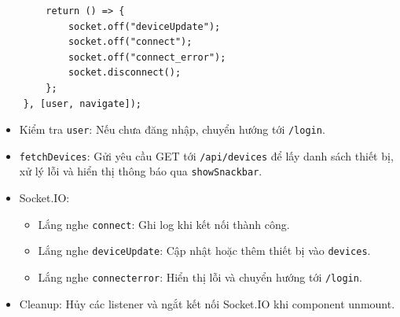 \begin{lstlisting}
        return () => {
            socket.off("deviceUpdate");
            socket.off("connect");
            socket.off("connect_error");
            socket.disconnect();
        };
    }, [user, navigate]);
                \end{lstlisting}
                \begin{itemize}
                    \item Kiểm tra \texttt{user}: Nếu chưa đăng nhập, chuyển hướng tới \texttt{/login}.
                    \item \texttt{fetchDevices}: Gửi yêu cầu GET tới \texttt{/api/devices} để lấy danh sách thiết bị, xử lý lỗi và hiển thị thông báo qua \texttt{showSnackbar}.
                    \item Socket.IO:
                    \begin{itemize}
                        \item Lắng nghe \texttt{connect}: Ghi log khi kết nối thành công.
                        \item Lắng nghe \texttt{deviceUpdate}: Cập nhật hoặc thêm thiết bị vào \texttt{devices}.
                        \item Lắng nghe \texttt{connecterror}: Hiển thị lỗi và chuyển hướng tới \texttt{/login}.
                    \end{itemize}
                    \item Cleanup: Hủy các listener và ngắt kết nối Socket.IO khi component unmount.
                \end{itemize}

